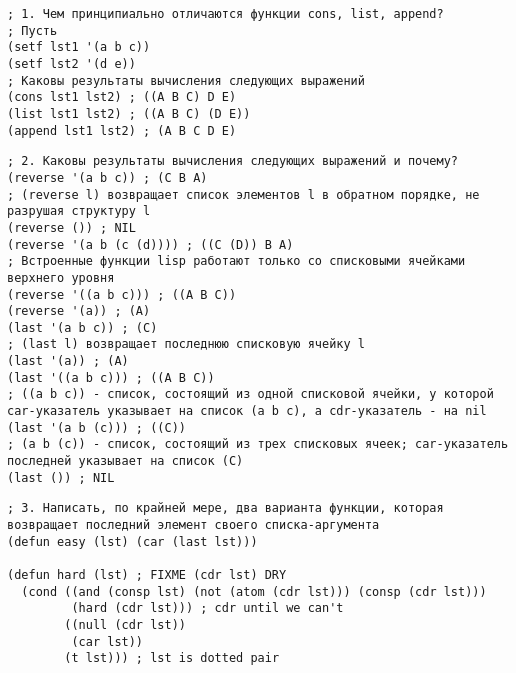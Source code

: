\documentclass[a4paper,oneside,14pt]{extarticle}
\begin{document}

\setcounter{page}{2}
\renewcommand{\contentsname}{СОДЕРЖАНИЕ}




\begin{lstlisting}
; 1. Чем принципиально отличаются функции cons, list, append?
; Пусть
(setf lst1 '(a b c))
(setf lst2 '(d e))
; Каковы результаты вычисления следующих выражений
(cons lst1 lst2) ; ((A B C) D E)
(list lst1 lst2) ; ((A B C) (D E))
(append lst1 lst2) ; (A B C D E)
\end{lstlisting}

\begin{lstlisting}
; 2. Каковы результаты вычисления следующих выражений и почему?
(reverse '(a b c)) ; (C B A)
; (reverse l) возвращает список элементов l в обратном порядке, не разрушая структуру l
(reverse ()) ; NIL
(reverse '(a b (c (d)))) ; ((C (D)) B A)
; Встроенные функции lisp работают только со списковыми ячейками верхнего уровня
(reverse '((a b c))) ; ((A B C))
(reverse '(a)) ; (A)
(last '(a b c)) ; (C)
; (last l) возвращает последнюю списковую ячейку l
(last '(a)) ; (A)
(last '((a b c))) ; ((A B C))
; ((a b c)) - список, состоящий из одной списковой ячейки, у которой car-указатель указывает на список (a b c), а cdr-указатель - на nil
(last '(a b (c))) ; ((C))
; (a b (c)) - список, состоящий из трех списковых ячеек; car-указатель последней указывает на список (C)
(last ()) ; NIL
\end{lstlisting}

\begin{lstlisting}
; 3. Написать, по крайней мере, два варианта функции, которая возвращает последний элемент своего списка-аргумента
(defun easy (lst) (car (last lst)))

(defun hard (lst) ; FIXME (cdr lst) DRY
  (cond ((and (consp lst) (not (atom (cdr lst))) (consp (cdr lst)))
         (hard (cdr lst))) ; cdr until we can't
        ((null (cdr lst))
         (car lst))
        (t lst))) ; lst is dotted pair
\end{lstlisting}
\end{document}
